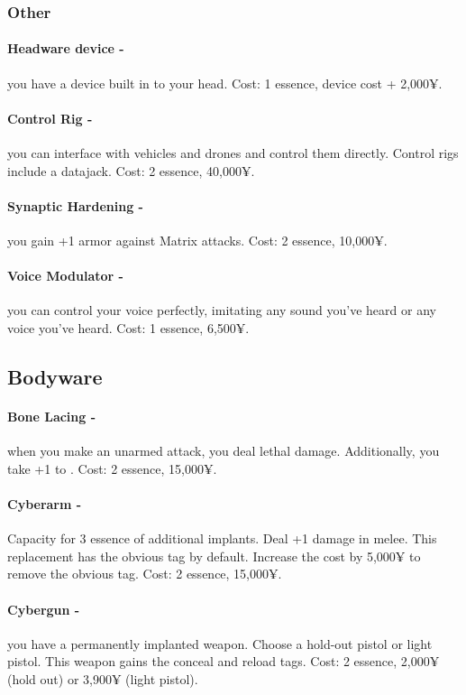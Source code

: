 \subsubsection{Other}
\paragraph{Headware device -} you have a device built in to your head. Cost: 1 essence, device cost + 2,000¥.

\paragraph{Control Rig -} you can interface with vehicles and drones and control them directly. Control rigs include a datajack. Cost: 2 essence, 40,000¥.

\paragraph{Synaptic Hardening -} you gain +1 armor against Matrix attacks. Cost: 2 essence, 10,000¥.

\paragraph{Voice Modulator -} you can control your voice perfectly, imitating any sound you’ve heard or any voice you’ve heard. Cost: 1 essence, 6,500¥.


\subsection{Bodyware}

\paragraph{Bone Lacing -} when you make an unarmed attack, you deal lethal damage. Additionally, you take +1 to . Cost: 2 essence, 15,000¥.

\paragraph{Cyberarm -} Capacity for 3 essence of additional implants. Deal +1 damage in melee. This replacement has the obvious tag by default. Increase the cost by 5,000¥ to remove the obvious tag. Cost: 2 essence, 15,000¥.

\paragraph{Cybergun -} you have a permanently implanted weapon. Choose a hold-out pistol or light pistol. This weapon gains the conceal and reload tags. Cost: 2 essence, 2,000¥ (hold out) or 3,900¥ (light pistol).

